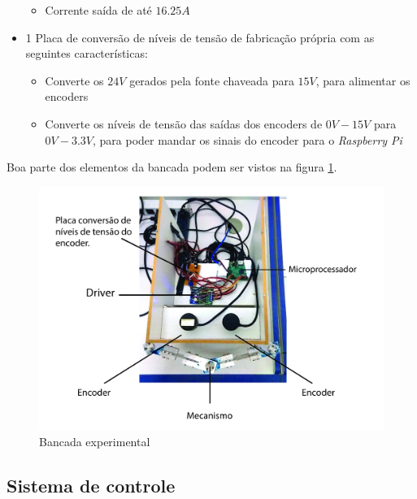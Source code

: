 \documentclass[]{politex}
\begin{document}
\begin{itemize}
\begin{itemize}
\item Corrente saída de até $16.25A$
\end{itemize}
\item 1 Placa de conversão de níveis de tensão de fabricação própria com as seguintes características:
\begin{itemize}
\item Converte os $24V$ gerados pela fonte chaveada para $15V$, para alimentar os encoders
\item Converte os níveis de tensão das saídas dos encoders de $0V-15V$ para $0V-3.3V$, para poder mandar os sinais do encoder para o \textit{Raspberry Pi}
\end{itemize}
\end{itemize}

Boa parte dos elementos da bancada podem ser vistos na figura \ref{fig:BancadaClara1}.

\begin{figure}[H]
    \centering
    \includegraphics[scale=0.1]{imagens/BancadaClara1.jpg}
    \caption{Bancada experimental}
    \label{fig:BancadaClara1}
\end{figure}


\subsection{Sistema de controle}
\end{document}
